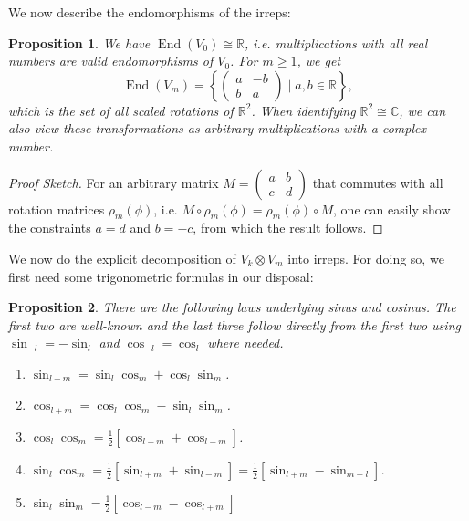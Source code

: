 \documentclass[12pt, a4paper]{article}
\theoremstyle{plain}
\newtheorem{pro}{Proposition}[section]
\theoremstyle{definition}
\theoremstyle{remark}
\newcommand{\R}{\mathds{R}}
\newcommand{\C}{\mathds{C}}
\DeclareMathOperator{\End}{End}
\begin{document}
We now describe the endomorphisms of the irreps:

\begin{pro}\label{endomorphisms}
We have $\End(V_0) \cong \R$, i.e. multiplications with all real numbers are valid endomorphisms of $V_0$. For $m \geq 1$, we get
\begin{equation*}
\End(V_m) = \left\lbrace \begin{pmatrix} a & -b \\ b & a \end{pmatrix} \mid a, b \in \R \right\rbrace,
\end{equation*}
which is the set of all scaled rotations of $\R^2$. When identifying $\R^2 \cong \C$, we can also view these transformations as arbitrary multiplications with a complex number.
\end{pro}

\begin{proof}[Proof Sketch]
For an arbitrary matrix $M = \begin{pmatrix} a & b \\ c & d\end{pmatrix}$ that commutes with all rotation matrices $\rho_m(\phi)$, i.e. $M \circ \rho_m(\phi) = \rho_m(\phi) \circ M$, one can easily show the constraints $a = d$ and $b = -c$, from which the result follows. 
\end{proof}

We now do the explicit decomposition of $V_k \otimes V_m$ into irreps. For doing so, we first need some trigonometric formulas in our disposal:

\begin{pro}\label{trigonometric formulas}
There are the following laws underlying sinus and cosinus. The first two are well-known and the last three follow directly from the first two using $\sin_{-l} = - \sin_l$ and $\cos_{-l} = \cos_l$ where needed.
\begin{enumerate}
\item $\sin_{l+m} = \sin_l \cos_m + \cos_l \sin_m$.
\item $\cos_{l+m} = \cos_l\cos_m - \sin_l \sin_m$.
\item $\cos_l \cos_m = \frac{1}{2} \left[ \cos_{l+m} + \cos_{l-m} \right]$.
\item $\sin_l \cos_m = \frac{1}{2} \left[  \sin_{l+m} + \sin_{l-m} \right] = \frac{1}{2} \left[ \sin_{l+m} - \sin_{m - l}\right]$.
\item $\sin_l \sin_m = \frac{1}{2} \left[ \cos_{l-m} - \cos_{l+m} \right]$
\end{enumerate}
\end{pro}
\end{document}
